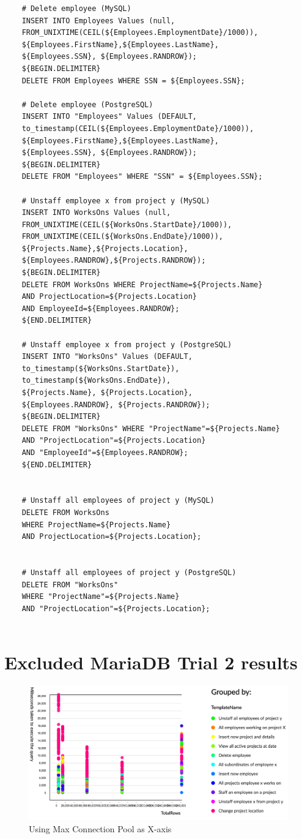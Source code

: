 \documentclass[12pt]{article}
\begin{document}
\begin{spacing}{1.9}
\begin{verbatim}
	# Delete employee (MySQL)
	INSERT INTO Employees Values (null,
	FROM_UNIXTIME(CEIL(${Employees.EmploymentDate}/1000)),
	${Employees.FirstName},${Employees.LastName}, 
	${Employees.SSN}, ${Employees.RANDROW});
	${BEGIN.DELIMITER}
	DELETE FROM Employees WHERE SSN = ${Employees.SSN};
	
	# Delete employee (PostgreSQL)
	INSERT INTO "Employees" Values (DEFAULT,
	to_timestamp(CEIL(${Employees.EmploymentDate}/1000)),
	${Employees.FirstName},${Employees.LastName}, 
	${Employees.SSN}, ${Employees.RANDROW});
	${BEGIN.DELIMITER}
	DELETE FROM "Employees" WHERE "SSN" = ${Employees.SSN};
	
	# Unstaff employee x from project y (MySQL)
	INSERT INTO WorksOns Values (null,
	FROM_UNIXTIME(CEIL(${WorksOns.StartDate}/1000)),
	FROM_UNIXTIME(CEIL(${WorksOns.EndDate}/1000)),
	${Projects.Name},${Projects.Location},
	${Employees.RANDROW},${Projects.RANDROW});
	${BEGIN.DELIMITER}
	DELETE FROM WorksOns WHERE ProjectName=${Projects.Name} 
	AND ProjectLocation=${Projects.Location} 
	AND EmployeeId=${Employees.RANDROW};
	${END.DELIMITER}
	
	# Unstaff employee x from project y (PostgreSQL)
	INSERT INTO "WorksOns" Values (DEFAULT,
	to_timestamp(${WorksOns.StartDate}),
	to_timestamp(${WorksOns.EndDate}),
	${Projects.Name}, ${Projects.Location},
	${Employees.RANDROW}, ${Projects.RANDROW});
	${BEGIN.DELIMITER}
	DELETE FROM "WorksOns" WHERE "ProjectName"=${Projects.Name} 
	AND "ProjectLocation"=${Projects.Location} 
	AND "EmployeeId"=${Employees.RANDROW};
	${END.DELIMITER}
	
	
	# Unstaff all employees of project y (MySQL)
	DELETE FROM WorksOns 
	WHERE ProjectName=${Projects.Name} 
	AND ProjectLocation=${Projects.Location};
	
	
	# Unstaff all employees of project y (PostgreSQL)
	DELETE FROM "WorksOns" 
	WHERE "ProjectName"=${Projects.Name}  
	AND "ProjectLocation"=${Projects.Location};
	
	\end{verbatim}
	
	\section{ Excluded MariaDB Trial 2 results }
	\begin{figure}[H]
		\centering
		\includegraphics[width=\textwidth]{maria2-temp.png}
		\caption{Using Max Connection Pool as X-axis }
		

\end{figure}
\end{spacing}
\end{document}
